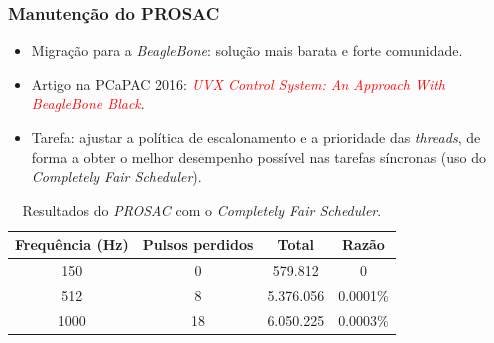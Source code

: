 \documentclass{beamer}
\begin{document}
\begin{frame}
\frametitle {Manutenção do PROSAC}

\begin{itemize}
  \item Migração para a \textit{BeagleBone}: solução mais barata e forte
  comunidade.
  \item Artigo na PCaPAC 2016: \textcolor{red}{\textit{UVX Control System: An
  Approach With BeagleBone Black}}.
  \item Tarefa: ajustar a política de escalonamento e a prioridade das
  \textit{threads}, de forma a obter o melhor desempenho possível nas tarefas
  síncronas (uso do \textit{Completely Fair Scheduler}).
\end{itemize}

\vspace{-12pt}
\begin{table}[h]

	\centering
	\caption{\label{tab:prosac} Resultados do \textit{PROSAC} com o
	\textit{Completely Fair Scheduler}.}
	\begin{tabular}{| c | c | c | c |}
		\hline
		\textbf{Frequência (Hz)} & \textbf{Pulsos perdidos} & \textbf{Total} &
		\textbf{Razão} \\ \hline 
		150 & 0 & 579.812  & 0 \\ \hline
		512 & 8 & 5.376.056 & 0.0001\% \\ \hline
		1000 & 18 & 6.050.225 & 0.0003\% \\ \hline
	\end{tabular}	    
\end{table}

\end{frame}

\end{document}
